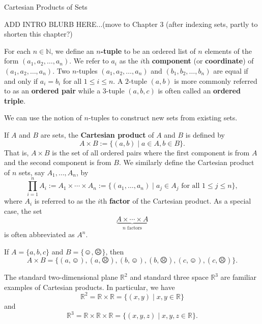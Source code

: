 \begin{section}{Cartesian Products of Sets}

ADD INTRO BLURB HERE...(move to Chapter 3 (after indexing sets, partly to shorten this chapter?)

\begin{definition}
For each $n\in \mathbb{N}$, we define an \textbf{$n$-tuple} to be an ordered list of $n$ elements of the form $(a_1, a_2,\ldots,a_n)$. We refer to $a_i$ as the $i$th \textbf{component} (or \textbf{coordinate}) of $(a_1, a_2,\ldots,a_n)$. Two $n$-tuples $(a_1, a_2,\ldots,a_n)$ and $(b_1, b_2,\ldots,b_n)$ are equal if and only if $a_i=b_i$ for all $1\leq i\leq n$. A $2$-tuple $(a,b)$ is more commonly referred to as an \textbf{ordered pair} while a $3$-tuple $(a,b,c)$ is often called an \textbf{ordered triple}.
\end{definition}

We can use the notion of $n$-tuples to construct new sets from existing sets.

\begin{definition}
If $A$ and $B$ are sets, the \textbf{Cartesian product} of $A$ and $B$ is defined by
\[
A\times B:=\{(a,b)\mid a\in A, b\in B\}.
\]
That is, $A\times B$ is the set of all ordered pairs where the first component is from $A$ and the second component is from $B$.  We similarly define the Cartesian product of $n$ sets, say $A_1, \ldots, A_n$, by
\[
\prod_{i=1}^{n} A_i:=A_1\times \cdots \times A_n:=\{(a_1,\ldots,a_n)\mid  a_j\in A_j \mbox{ for all }1\leq j\leq n\},
\]
where $A_i$ is referred to as the $i$th \textbf{factor} of the Cartesian product. As a special case, the set 
\[
\underbrace{A\times \cdots \times A}_{n\text{ factors}}
\]
is often abbreviated as $A^n$.
\end{definition}

\begin{example}\label{ex:CartesianProduct}
If $A=\{a,b,c\}$ and $B=\{\smiley,\frownie\}$, then 
\[
A\times B=\{(a,\smiley), (a,\frownie),(b,\smiley),(b,\frownie), (c,\smiley),(c,\frownie)\}.
\]
\end{example}

\begin{example}\label{ex:CartesianProduct}
The standard two-dimensional plane $\mathbb{R}^2$ and standard three space $\mathbb{R}^{3}$ are familiar examples of Cartesian products.  In particular, we have
\[
\mathbb{R}^2=\mathbb{R}\times \mathbb{R}=\{(x,y)\mid x,y\in \mathbb{R}\}
\]
and
\[
\mathbb{R}^3=\mathbb{R}\times \mathbb{R}\times \mathbb{R}=\{(x,y,z)\mid x,y,z\in \mathbb{R}\}.
\]
\end{example}


\end{section}
